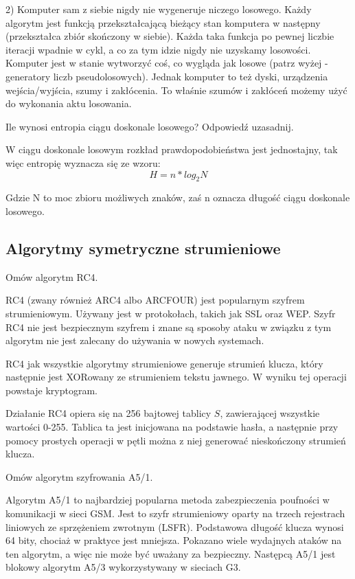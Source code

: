 \documentclass[answers,11pt]{exam}
\begin{document}
\begin{questions}
\begin{solution}
2) Komputer sam z siebie nigdy nie wygeneruje niczego losowego. Każdy algorytm jest funkcją przekształcającą bieżący stan komputera w następny (przekształca zbiór skończony w siebie). Każda taka funkcja po pewnej liczbie iteracji wpadnie w cykl, a co za tym idzie nigdy nie uzyskamy losowości. Komputer jest w stanie wytworzyć coś, co wygląda jak losowe (patrz wyżej - generatory liczb pseudolosowych). Jednak komputer to też dyski, urządzenia wejścia/wyjścia, szumy i zakłócenia. To właśnie szumów i zakłóceń możemy użyć do wykonania aktu losowania.
\end{solution}

\question Ile wynosi entropia ciągu doskonale losowego? Odpowiedź uzasadnij.
\begin{solution}
W ciągu doskonale losowym rozkład prawdopodobieństwa jest jednostajny, tak więc entropię wyznacza się ze wzoru:
\begin{equation}
H = n * log_2 N
\end{equation}

Gdzie N to moc zbioru możliwych znaków, zaś n oznacza długość ciągu doskonale losowego.
\end{solution}
\end{questions}

\subsection{Algorytmy symetryczne strumieniowe}
\begin{questions}

\question Omów algorytm RC4.
\begin{solution}
RC4 (zwany również ARC4 albo ARCFOUR) jest popularnym szyfrem strumieniowym. Używany jest w protokołach, takich jak SSL oraz WEP. Szyfr RC4 nie jest bezpiecznym szyfrem i znane są sposoby ataku w związku z tym algorytm nie jest zalecany do używania w nowych systemach.

RC4 jak wszystkie algorytmy strumieniowe generuje strumień klucza, który następnie jest XORowany ze strumieniem tekstu jawnego. W wyniku tej operacji powstaje kryptogram.

Działanie RC4 opiera się na 256 bajtowej tablicy $S$, zawierającej wszystkie wartości 0-255. Tablica ta jest inicjowana na podstawie hasła, a następnie przy pomocy prostych operacji w pętli można z niej generować nieskończony strumień klucza. 
\end{solution}

\question Omów algorytm szyfrowania A5/1.
\begin{solution}
Algorytm A5/1 to najbardziej popularna metoda zabezpieczenia poufności w komunikacji w sieci GSM. Jest to szyfr strumieniowy oparty na trzech rejestrach liniowych ze sprzężeniem zwrotnym (LSFR). Podstawowa długość klucza wynosi 64 bity, chociaż w praktyce jest mniejsza. Pokazano wiele wydajnych ataków na ten algorytm, a więc nie może być uważany za bezpieczny. Następcą A5/1 jest blokowy algorytm A5/3 wykorzystywany w sieciach G3.
\end{solution}

\end{questions}
\end{document}
